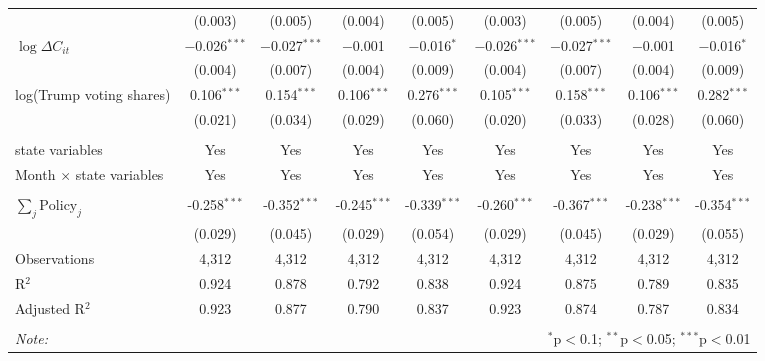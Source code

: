 \begin{tabular}{@{\extracolsep{1pt}}lcccccccc}
  & (0.003) & (0.005) & (0.004) & (0.005) & (0.003) & (0.005) & (0.004) & (0.005) \\ 
  $\log \Delta C_{it}$ & $-$0.026$^{***}$ & $-$0.027$^{***}$ & $-$0.001 & $-$0.016$^{*}$ & $-$0.026$^{***}$ & $-$0.027$^{***}$ & $-$0.001 & $-$0.016$^{*}$ \\ 
  & (0.004) & (0.007) & (0.004) & (0.009) & (0.004) & (0.007) & (0.004) & (0.009) \\ 
  log(Trump voting shares) & 0.106$^{***}$ & 0.154$^{***}$ & 0.106$^{***}$ & 0.276$^{***}$ & 0.105$^{***}$ & 0.158$^{***}$ & 0.106$^{***}$ & 0.282$^{***}$ \\ 
  & (0.021) & (0.034) & (0.029) & (0.060) & (0.020) & (0.033) & (0.028) & (0.060) \\ 
 \hline \\[-1.8ex] 
state variables & Yes & Yes & Yes & Yes & Yes & Yes & Yes & Yes \\ 
Month $\times$ state variables & Yes & Yes & Yes & Yes & Yes & Yes & Yes & Yes \\ 
\hline \\[-1.8ex] 
$\sum_j \mathrm{Policy}_j$ & -0.258$^{***}$ & -0.352$^{***}$ & -0.245$^{***}$ & -0.339$^{***}$ & -0.260$^{***}$ & -0.367$^{***}$ & -0.238$^{***}$ & -0.354$^{***}$ \\ 
 & (0.029) & (0.045) & (0.029) & (0.054) & (0.029) & (0.045) & (0.029) & (0.055) \\ 
Observations & 4,312 & 4,312 & 4,312 & 4,312 & 4,312 & 4,312 & 4,312 & 4,312 \\ 
R$^{2}$ & 0.924 & 0.878 & 0.792 & 0.838 & 0.924 & 0.875 & 0.789 & 0.835 \\ 
Adjusted R$^{2}$ & 0.923 & 0.877 & 0.790 & 0.837 & 0.923 & 0.874 & 0.787 & 0.834 \\ 
\hline 
\hline \\[-1.8ex] 
\textit{Note:}  & \multicolumn{8}{r}{$^{*}$p$<$0.1; $^{**}$p$<$0.05; $^{***}$p$<$0.01} \\ 
\end{tabular} 